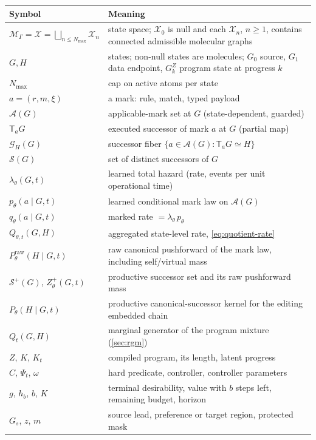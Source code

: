 \documentclass{article}
\newcommand{\M}{\mathcal{M}_{\Gamma}}
\newcommand{\A}{\mathcal{A}}
\newcommand{\Sset}{\mathcal{S}}
\newcommand{\T}{\mathsf{T}}
\newcommand{\Pmol}{P_{\theta}}
\newcommand{\Praw}{P^{\mathrm{raw}}_{\theta}}
\newcommand{\X}{\mathcal{X}}
\newcommand{\Gset}{\mathcal{G}}
\theoremstyle{definition}
\theoremstyle{remark}
\begin{document}
\begin{table}[h]
\centering
\small
\begin{tabularx}{\textwidth}{@{}lY@{}}
\toprule
Symbol & Meaning\\
\midrule
$\M=\X=\bigsqcup_{n\le N_{\max}}\X_n$ & state space; $\X_0$ is null and each $\X_n$, $n\ge1$, contains connected admissible molecular graphs\\
$G,H$ & states; non-null states are molecules; $G_0$ source, $G_1$ data endpoint, $G^Z_k$ program state at progress $k$\\
$N_{\max}$ & cap on active atoms per state\\
$a=(r,m,\xi)$ & a mark: rule, match, typed payload\\
$\A(G)$ & applicable-mark set at $G$ (state-dependent, guarded)\\
$\T_aG$ & executed successor of mark $a$ at $G$ (partial map)\\
$\Gset_H(G)$ & successor fiber $\{a\in\A(G):\T_aG\simeq H\}$\\
$\Sset(G)$ & set of distinct successors of $G$\\
$\lambda_\theta(G,t)$ & learned total hazard (rate, events per unit operational time)\\
$p_\theta(a\mid G,t)$ & learned conditional mark law on $\A(G)$\\
$q_\theta(a\mid G,t)$ & marked rate $=\lambda_\theta\,p_\theta$\\
$Q_{\theta,t}(G,H)$ & aggregated state-level rate, \eqref{eq:quotient-rate}\\
$\Praw(H\mid G,t)$ & raw canonical pushforward of the mark law, including self/virtual mass\\
$\Sset^+(G)$, $Z_\theta^+(G,t)$ & productive successor set and its raw pushforward mass\\
$\Pmol(H\mid G,t)$ & productive canonical-successor kernel for the editing embedded chain\\
$Q_t(G,H)$ & marginal generator of the program mixture (\cref{sec:rgm})\\
$Z$, $K$, $K_t$ & compiled program, its length, latent progress\\
$C$, $\Psi_t$, $\omega$ & hard predicate, controller, controller parameters\\
$g$, $h_b$, $b$, $K$ & terminal desirability, value with $b$ steps left, remaining budget, horizon\\
$G_s$, $z$, $m$ & source lead, preference or target region, protected mask\\
\bottomrule
\end{tabularx}
\end{table}
\end{document}

